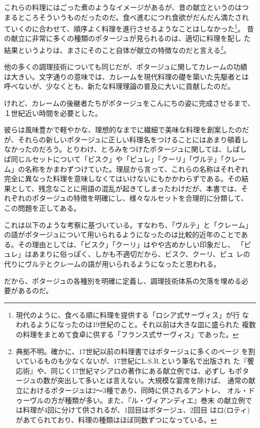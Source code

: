 これらの料理にはごった煮のようなイメージがあるが、昔の献立というのはつ
まるところそういうものだったのだ。食べ進むにつれ食欲がだんだん満たされ
ていくのに合わせて、順序よく料理を進行させるようなことはしなかった\footnote{現代のように、食べる順に料理を提供する「ロシア式サーヴィス」が行
  なわれるようになったのは19世紀のこと。それ以前は大きな皿に盛られた
  複数の料理をまとめて食卓に供する「フランス式サーヴィス」であった。}。
昔の献立に非常に多くの種類のポタージュが見られるのは、適切に料理を配し
た結果というよりは、まさにそのこと自体が献立の特徴なのだと言える\footnote{典拠不明。確かに、17世紀以前の料理書ではポタージュに多くのページ
  を割いているものも少なくないが、17世紀にL.S.R.という筆名で出版され
  た『饗応術』や、同じく17世紀マシアロの著作にある献立例では、必ずし
  もポタージュの数が突出して多いとは言えない。大規模な宴席を除けば、
  通常の献立におけるポタージュは2〜3種であり、同時に供されるアントレ、
  オル・ドゥーヴルの方が種類が多い。また、『ル・ヴィアンディエ』巻末
  の献立例では料理が4回に分けて供されるが、1回目はポタージュ、2回目
  はロ(ロティ)があてられており、料理の種類はほぼ同数ずつになっている。}。

他の多くの調理技術についても同じだが、ポタージュに関してカレームの功績
は大きい。文字通りの意味では、カレームを現代料理の礎を築いた先駆者とは
呼べないが、少なくとも、新たな料理理論の普及に大いに貢献したのだ。

けれど、カレームの後継者たちがポタージュをこんにちの姿に完成させるまで、
１世紀近い時間を必要とした。

彼らは風味豊かで軽やかな、理想的なまでに繊細で美味な料理を創案したのだ
が、それらの新しいポタージュに正しい料理名をつけることにはあまり頓着し
なかったのだろう。とりわけ、とろみをつけたポタージュに関しては、しばし
ば同じルセットについて「ビスク」や「ピュレ」「クーリ」「ヴルテ」「クレー
ム」の名称をかまわずつけていた。理屈から言って、これらの名称はそれぞれ
完全に異なった料理を意味しなくてはいけないにもかかわらずである。その結
果として、残念なことに用語の混乱が起きてしまったわけだが、本書では、そ
れぞれのポタージュの特徴を明確にし、様々なルセットを合理的に分類して、
この問題を正してある。

これは以下のような考察に基づいている。すなわち、「ヴルテ」と「クレーム」
の語がポタージュについて用いられるようになったのは比較的近年のことであ
る。その理由としては、「ビスク」「クーリ」はやや古めかしい印象だし、
「ピュレ」はあまりに俗っぽく、しかも不適切だから、ビスク、クーリ、ピュ
レの代りにヴルテとクレームの語が用いられるようになったと思われる。

だから、ポタージュの各種別を明確に定義し、調理技術体系の欠落を埋める必
要があるのだ。

